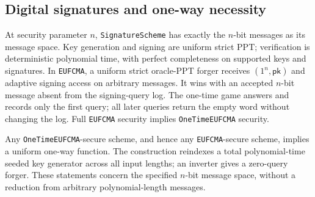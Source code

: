 \begin{result}
\subsection{Digital signatures and one-way necessity}
At security parameter $n$, \texttt{SignatureScheme} has exactly the $n$-bit messages as its message
space. Key generation and signing are uniform strict PPT; verification is deterministic
polynomial time, with perfect completeness on supported keys and signatures. In \texttt{EUFCMA},
a uniform strict oracle-PPT forger receives $(1^n,\mathsf{pk})$ and adaptive signing access on
arbitrary messages. It wins with an accepted $n$-bit message absent from the signing-query log.
The one-time game answers and records only the first query; all later queries return the empty
word without changing the log. Full \texttt{EUFCMA} security implies \texttt{OneTimeEUFCMA} security.

Any \texttt{OneTimeEUFCMA}-secure scheme, and hence any \texttt{EUFCMA}-secure scheme, implies a
uniform one-way function. The construction reindexes a total polynomial-time seeded key generator
across all input lengths; an inverter gives a zero-query forger. These statements concern the
specified $n$-bit message space, without a reduction from arbitrary polynomial-length messages.
\citep{GoldwasserMicaliRivest1988,Rompel1990}
\end{result}

